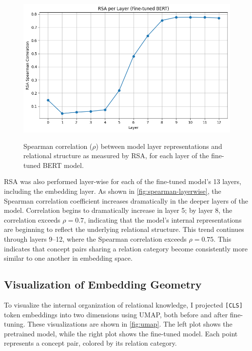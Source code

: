 \documentclass[stu,floatsintext]{apa7}
\begin{document}
\medskip
\begin{figure}[h]
  \centering
  \caption{Spearman correlation ($\rho$) between model layer representations and relational structure as measured by RSA, for each layer of the fine-tuned BERT model.}
  \includegraphics[width=\linewidth]{rsa-finetuned-layerwise.png}
  \label{fig:spearman-layerwise}
\end{figure}

RSA was also performed layer-wise for each of the fine-tuned model's 13 layers, including the embedding layer. As shown in \autoref{fig:spearman-layerwise}, the Spearman correlation coefficient increases dramatically in the deeper layers of the model. Correlation begins to dramatically increase in layer 5; by layer 8, the correlation exceeds $\rho = 0.7$, indicating that the model's internal representations are beginning to reflect the underlying relational structure. This trend continues through layers 9–12, where the Spearman correlation exceeds $\rho = 0.75$. This indicates that concept pairs sharing a relation category become consistently more similar to one another in embedding space.

\subsection{Visualization of Embedding Geometry}

To visualize the internal organization of relational knowledge, I projected \texttt{[CLS]} token embeddings into two dimensions using UMAP, both before and after fine-tuning. These visualizations are shown in \autoref{fig:umap}. The left plot shows the pretrained model, while the right plot shows the fine-tuned model. Each point represents a concept pair, colored by its relation category.
\end{document}
